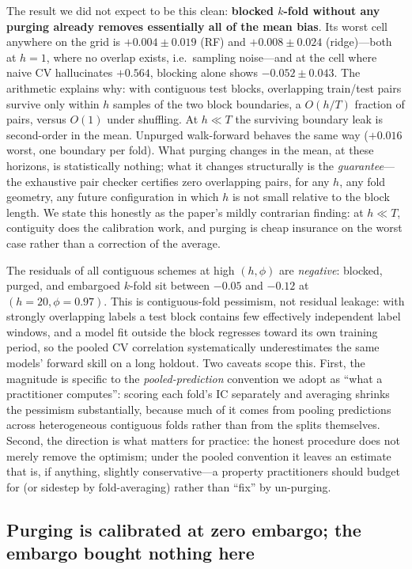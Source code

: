\documentclass[11pt]{article}
\begin{document}
The result we did not expect to be this clean: \textbf{blocked $k$-fold
without any purging already removes essentially all of the mean bias}. Its
worst cell anywhere on the grid is $+0.004 \pm 0.019$ (RF) and
$+0.008 \pm 0.024$ (ridge)---both at $h=1$, where no overlap exists, i.e.\
sampling noise---and at the cell where naive CV hallucinates $+0.564$,
blocking alone shows $-0.052 \pm 0.043$. The arithmetic explains why: with
contiguous test blocks, overlapping train/test pairs survive only within $h$
samples of the two block boundaries, a $O(h/T)$ fraction of pairs, versus
$O(1)$ under shuffling. At $h \ll T$ the surviving boundary leak is
second-order in the mean. Unpurged walk-forward behaves the same way
($+0.016$ worst, one boundary per fold). What purging changes in the mean,
at these horizons, is statistically nothing; what it changes structurally is
the \emph{guarantee}---the exhaustive pair checker certifies zero
overlapping pairs, for any $h$, any fold geometry, any future configuration
in which $h$ is not small relative to the block length. We state this
honestly as the paper's mildly contrarian finding: at $h \ll T$, contiguity
does the calibration work, and purging is cheap insurance on the worst
case rather than a correction of the average.

The residuals of all contiguous schemes at high $(h,\phi)$ are
\emph{negative}: blocked, purged, and embargoed $k$-fold sit between
$-0.05$ and $-0.12$ at $(h{=}20, \phi{=}0.97)$. This is contiguous-fold
pessimism, not residual leakage: with strongly overlapping labels a test
block contains few effectively independent label windows, and a model fit
outside the block regresses toward its own training period, so the pooled CV
correlation systematically underestimates the same models' forward skill on
a long holdout. Two caveats scope this. First, the magnitude is specific to
the \emph{pooled-prediction} convention we adopt as ``what a practitioner
computes'': scoring each fold's IC separately and averaging shrinks the
pessimism substantially, because much of it comes from pooling predictions
across heterogeneous contiguous folds rather than from the splits
themselves. Second, the direction is what matters for practice: the honest
procedure does not merely remove the optimism; under the pooled convention it
leaves an estimate that is, if anything, slightly conservative---a property
practitioners should budget for (or sidestep by fold-averaging) rather than
``fix'' by un-purging.

\subsection{Purging is calibrated at zero embargo; the embargo bought nothing here}
\label{sec:embargo}
\end{document}
